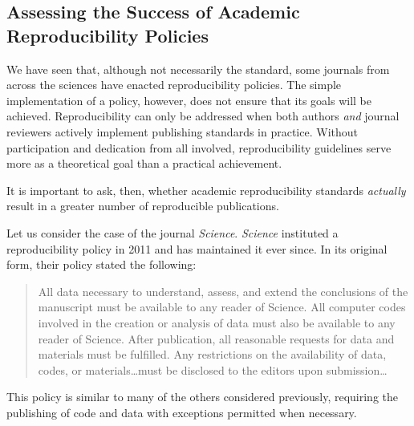 \documentclass[12pt,twoside]{reedthesis}
\begin{document}
\hypertarget{assessing-the-success-of-academic-reproducibility-policies}{%
\subsection{Assessing the Success of Academic Reproducibility Policies}\label{assessing-the-success-of-academic-reproducibility-policies}}

We have seen that, although not necessarily the standard, some journals from across the sciences have enacted reproducibility policies. The simple implementation of a policy, however, does not ensure that its goals will be achieved. Reproducibility can only be addressed when both authors \emph{and} journal reviewers actively implement publishing standards in practice. Without participation and dedication from all involved, reproducibility guidelines serve more as a theoretical goal than a practical achievement.

It is important to ask, then, whether academic reproducibility standards \emph{actually} result in a greater number of reproducible publications.

Let us consider the case of the journal \emph{Science}. \emph{Science} instituted a reproducibility policy in 2011 and has maintained it ever since. In its original form, their policy stated the following:
\begin{quote}
All data necessary to understand, assess, and extend the conclusions of the manuscript must be available to any reader of Science. All computer codes involved in the creation or analysis of data must also be available to any reader of Science. After publication, all reasonable requests for data and materials must be fulfilled. Any restrictions on the availability of data, codes, or materials\ldots must be disclosed to the editors upon submission\ldots{}
\end{quote}
This policy is similar to many of the others considered previously, requiring the publishing of code and data with exceptions permitted when necessary.
\end{document}
